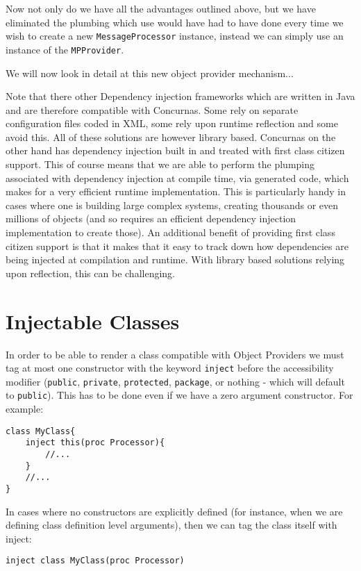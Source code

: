\documentclass[conc-doc]{subfiles}
\begin{document}
Now not only do we have all the advantages outlined above, but we have eliminated the plumbing which use would have had to have done every time we wish to create a new \lstinline{MessageProcessor} instance, instead we can simply use an instance of the \lstinline{MPProvider}.

We will now look in detail at this new object provider mechanism...

Note that there other Dependency injection frameworks which are written in Java and are therefore compatible with Concurnas. Some rely on separate configuration files coded in XML, some rely upon runtime reflection and some avoid this. All of these solutions are however library based. Concurnas on the other hand has dependency injection built in and treated with first class citizen support. This of course means that we are able to perform the plumping associated with dependency injection at compile time, via generated code, which makes for a very efficient runtime implementation. This is particularly handy in cases where one is building large complex systems, creating thousands or even millions of objects (and so requires an efficient dependency injection implementation to create those). An additional benefit of providing first class citizen support is that it makes that it easy to track down how dependencies are being injected at compilation and runtime. With library based solutions relying upon reflection, this can be challenging.

\section{Injectable Classes}
In order to be able to render a class compatible with Object Providers we must tag at most one constructor with the keyword \lstinline{inject} before the accessibility modifier (\lstinline{public}, \lstinline{private}, \lstinline{protected}, \lstinline{package}, or nothing - which will default to \lstinline{public}). This has to be done even if we have a zero argument constructor. For example:
\begin{lstlisting}
class MyClass{
	inject this(proc Processor){
		//...
	}
	//...
}
\end{lstlisting}

In cases where no constructors are explicitly defined (for instance, when we are defining class definition level arguments), then we can tag the class itself with inject:
\begin{lstlisting}
inject class MyClass(proc Processor)
\end{lstlisting}
\end{document}
